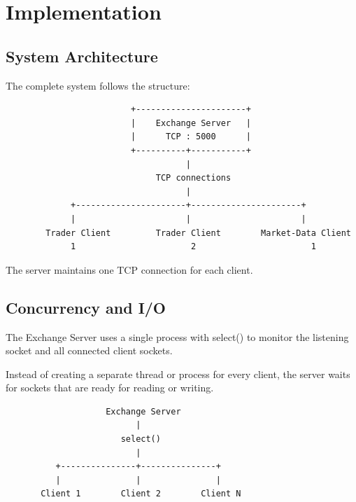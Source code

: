 \documentclass[11pt,a4paper]{article}
\begin{document}

\section{Implementation}

\subsection{System Architecture}

The complete system follows the structure:

\begin{verbatim}
                         +----------------------+
                         |    Exchange Server   |
                         |      TCP : 5000      |
                         +----------+-----------+
                                    |
                              TCP connections
                                    |
             +----------------------+----------------------+
             |                      |                      |
        Trader Client         Trader Client        Market-Data Client
             1                       2                       1
\end{verbatim}

The server maintains one TCP connection for each client.


\subsection{Concurrency and I/O}

The Exchange Server uses a single process with {select()} to monitor
the listening socket and all connected client sockets.

Instead of creating a separate thread or process for every client, the server
waits for sockets that are ready for reading or writing.

\begin{verbatim}
                    Exchange Server
                          |
                       select()
                          |
          +---------------+---------------+
          |               |               |
       Client 1        Client 2        Client N
\end{verbatim}
\end{document}

